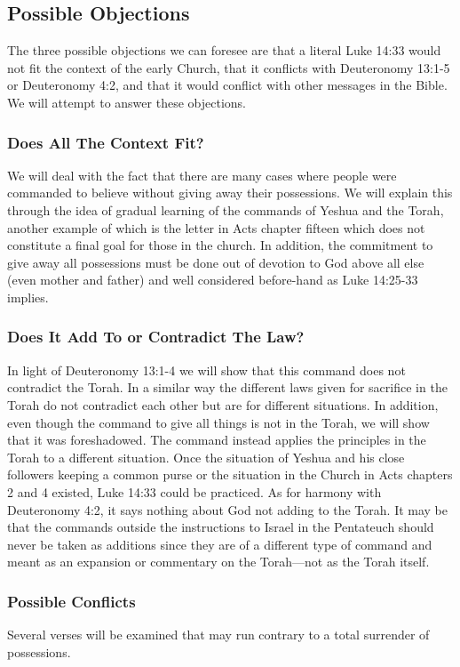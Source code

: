 \documentclass[11pt]{article}
\begin{document}
\subsection{Possible Objections}
The three possible objections we can foresee are that a literal Luke 14:33 would not fit the context of the early Church, that it conflicts with Deuteronomy 13:1-5 or Deuteronomy 4:2, and that it would conflict with other messages in the Bible. We will attempt to answer these objections.

\subsubsection{Does All The Context Fit?}
We will deal with the fact that there are many cases where people were commanded to believe without giving away their possessions. We will explain this through the idea of gradual learning of the commands of Yeshua and the Torah, another example of which is the letter in Acts chapter fifteen which does not constitute a final goal for those in the church. In addition, the commitment to give away all possessions must be done out of devotion to God above all else (even mother and father) and well considered before-hand as Luke 14:25-33 implies. 

\subsubsection{Does It Add To or Contradict The Law?}
In light of Deuteronomy 13:1-4 we will show that this command does not contradict the Torah. In a similar way the different laws given for sacrifice in the Torah do not contradict each other but are for different situations. In addition, even though the command to give all things is not in the Torah, we will show that it was foreshadowed. The command instead applies the principles in the Torah to a different situation. Once the situation of Yeshua and his close followers keeping a common purse or the situation in the Church in Acts chapters 2 and 4 existed, Luke 14:33 could be practiced. As for harmony with Deuteronomy 4:2, it says nothing about God not adding to the Torah. It may be that the commands outside the instructions to Israel in the Pentateuch should never be taken as additions since they are of a different type of command and meant as an expansion or commentary on the Torah---not as the Torah itself.

\subsubsection{Possible Conflicts}
Several verses will be examined that may run contrary to a total surrender of possessions.
\end{document}
